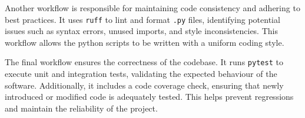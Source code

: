 \documentclass{article}
\begin{document}
Another workflow is responsible for maintaining code consistency and
adhering to best practices. It uses \texttt{ruff} to lint and format
\texttt{.py} files, identifying potential issues such as syntax
errors, unused imports, and style inconsistencies. This workflow
allows the python scripts to be written with a uniform coding style.

The final workflow ensures the correctness of the codebase. It runs
\texttt{pytest} to execute unit and integration tests, validating the
expected behaviour of the software. Additionally, it includes a code
coverage check, ensuring that newly introduced or modified code is
adequately tested. This helps prevent regressions and maintain the
reliability of the project.
\end{document}

